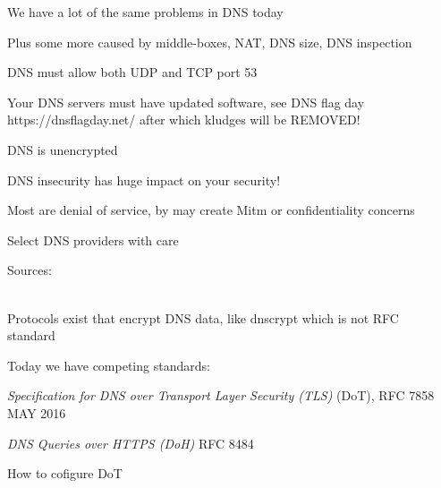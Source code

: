 \documentclass[Screen16to9,17pt]{foils}
\begin{document}
\begin{list1}
\item We have a lot of the same problems in DNS today
\item Plus some more caused by middle-boxes, NAT, DNS size, DNS inspection
\begin{list2}
\item DNS must allow both UDP and TCP port 53
\item Your DNS servers must have updated software, see DNS flag day\\ https://dnsflagday.net/ after which kludges will be REMOVED!
\item DNS is unencrypted
\end{list2}
\end{list1}



\begin{list1}
\item DNS insecurity has huge impact on your security!
\item Most are denial of service, by may create Mitm or confidentiality concerns
\item Select DNS providers with care
\end{list1}

Sources:\\
{\tiny
{}\\
}




\begin{list2}
\item Protocols exist that encrypt DNS data, like dnscrypt which is not RFC\\ standard  
\item Today we have competing standards:
\item
\emph{Specification for DNS over Transport Layer Security (TLS)} (DoT), RFC 7858 MAY 2016\\

\item \emph{DNS Queries over HTTPS (DoH)} RFC 8484

\item How to cofigure DoT 
\end{list2}
\end{document}
